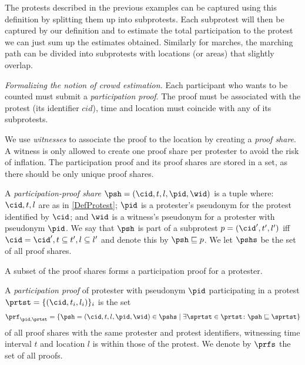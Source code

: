 The protests described in the previous examples can be captured using this definition by splitting 
them up into subprotests.
Each subprotest will then be captured by our definition and to estimate the total participation to the protest we can just sum up the estimates obtained.
Similarly for marches, the marching path can be divided into subprotests with 
locations (or areas) that slightly overlap.

\emph{Formalizing the notion of crowd estimation.} Each participant who wants to 
be counted must submit a \emph{participation proof}.
The proof must be associated with the protest (\ie its identifier \(cid\)), time and location must coincide with any of its subprotests.

We use \emph{witnesses} to associate the proof to the location by creating a 
\emph{proof share}.
A witness is only allowed to create one proof share per protester to avoid the 
risk of inflation.
The participation proof and its proof shares are stored in a set, as there should be only unique proof shares.

\begin{definition}
  A \emph{participation-proof share} \(\psh = (\cid, t, l, \pid, \wid)\) is a 
  tuple where:
  \(\cid, t, l\) are as in \cref{DefProtest};
  \(\pid\) is a protester's pseudonym for the protest identified by \(\cid\); 
  and
  \(\wid\) is a witness's pseudonym for a protester with pseudonym \(\pid\).
  We say that \(\psh\) is part of a subprotest \(p = (\cid', t', l')\) iff 
  \(\cid = \cid', t\subseteq t', l\subseteq l'\) and denote this by \(\psh 
    \sqsubseteq p\).
  We let \(\pshs\) be the set of all proof shares.
\end{definition}

A subset of the proof shares forms a participation proof for a protester.

\begin{definition}%
  \label{DefParticipationProof}
  A \emph{participation proof} of protester with pseudonym \(\pid\) 
  participating in a protest \(\prtst = \{ (\cid, t_i, l_i) \}_i\) is the set
  \begin{multline}
    \nonumber
    \prf_{\pid, \prtst} =
    \left\{ \psh = (\cid, t, l, \pid, \wid)\in \pshs \mid
      \exists \sprtst\in \prtst\colon \psh\sqsubseteq \sprtst \right\}
  \end{multline}
  of all proof shares with the same protester and protest identifiers, 
  witnessing time interval \(t\) and location \(l\) is within those of the 
  protest.
  We denote by \(\prfs\) the set of all proofs.
\end{definition}

